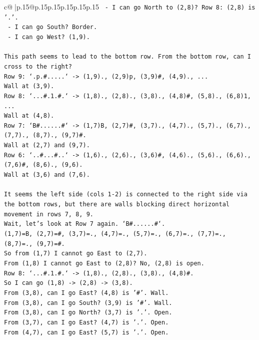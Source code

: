\documentclass{article}
\begin{document}
{\begin{supertabular}{c@{$\;$}|p{.15\linewidth}@{}p{.15\linewidth}p{.15\linewidth}p{.15\linewidth}p{.15\linewidth}p{.15\linewidth}}
{{{\texttt{   {-} I can go North to (2,8)? Row 8: (2,8) is '.'.} \\
\texttt{   {-} I can go South? Border.} \\
\texttt{   {-} I can go West? (1,9).} \\
\\ 
\texttt{This path seems to lead to the bottom row. From the bottom row, can I cross to the right?} \\
\texttt{Row 9: `.p.\#.....` {-}> (1,9)., (2,9)p, (3,9)\#, (4,9)., ...} \\
\texttt{Wall at (3,9).} \\
\texttt{Row 8: `...\#.1.\#.` {-}> (1,8)., (2,8)., (3,8)., (4,8)\#, (5,8)., (6,8)1, ...} \\
\texttt{Wall at (4,8).} \\
\texttt{Row 7: `B\#......\#` {-}> (1,7)B, (2,7)\#, (3,7)., (4,7)., (5,7)., (6,7)., (7,7)., (8,7)., (9,7)\#.} \\
\texttt{Wall at (2,7) and (9,7).} \\
\texttt{Row 6: `..\#...\#..` {-}> (1,6)., (2,6)., (3,6)\#, (4,6)., (5,6)., (6,6)., (7,6)\#, (8,6)., (9,6).} \\
\texttt{Wall at (3,6) and (7,6).} \\
\\ 
\texttt{It seems the left side (cols 1{-}2) is connected to the right side via the bottom rows, but there are walls blocking direct horizontal movement in rows 7, 8, 9.} \\
\texttt{Wait, let's look at Row 7 again. `B\#......\#`.} \\
\texttt{(1,7)=B, (2,7)=\#, (3,7)=., (4,7)=., (5,7)=., (6,7)=., (7,7)=., (8,7)=., (9,7)=\#.} \\
\texttt{So from (1,7) I cannot go East to (2,7).} \\
\texttt{From (1,8) I cannot go East to (2,8)? No, (2,8) is open.} \\
\texttt{Row 8: `...\#.1.\#.` {-}> (1,8)., (2,8)., (3,8)., (4,8)\#.} \\
\texttt{So I can go (1,8) {-}> (2,8) {-}> (3,8).} \\
\texttt{From (3,8), can I go East? (4,8) is '\#'. Wall.} \\
\texttt{From (3,8), can I go South? (3,9) is '\#'. Wall.} \\
\texttt{From (3,8), can I go North? (3,7) is '.'. Open.} \\
\texttt{From (3,7), can I go East? (4,7) is '.'. Open.} \\
\texttt{From (4,7), can I go East? (5,7) is '.'. Open.} \\
}}}
\end{supertabular}}
\end{document}
